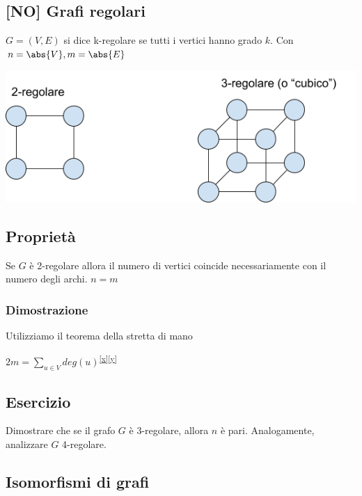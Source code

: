 \documentclass{article}
\begin{document}
{{{\hypertarget{h.m8b6lpkoqj6x}{\subsection{\texorpdfstring{{{[}NO{]} Grafi regolari}}{{[}NO{]} Grafi regolari}}\label{h.m8b6lpkoqj6x}}

{$G=(V,E)$ si dice k-regolare se tutti i vertici hanno grado $k$. Con $n=\abs{V},m=\abs{E}$}

{\includegraphics{images/image524.png}}

\subsection{Proprietà}

{Se $G$ è 2-regolare allora il numero di vertici coincide necessariamente con il numero degli archi. $n=m$}

\subsubsection{Dimostrazione}

{Utilizziamo il teorema della stretta di mano}

$2m=\sum_{u\in V}{deg(u)}$\textsuperscript{\protect\hyperlink{cmnt24}{{[}x{]}}\protect\hyperlink{cmnt25}{{[}y{]}}}

\subsection{Esercizio}

{Dimostrare che se il grafo $G$ è 3-regolare, allora $n$ è pari. Analogamente, analizzare $G$ 4-regolare. }

\hypertarget{h.d5v408sc7po0}{\subsection{\texorpdfstring{{Isomorfismi di
grafi}}{Isomorfismi di grafi}}\label{h.d5v408sc7po0}}

}}}
\end{document}
